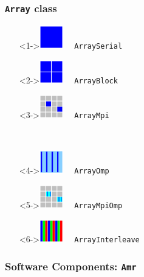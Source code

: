 \documentclass{beamer}
\newcommand{\code}[1]{\texttt{#1}}
\begin{document}
\begin{frame}
\frametitle{\code{Array} class}

\begin{minipage}{1.8in}
\begin{itemize}
\item[]<1->\includegraphics[width=0.4in]{array-serial.png} \ \ \code{ArraySerial}
\item[]<2->\includegraphics[width=0.4in]{array-block.png} \ \ \code{ArrayBlock}
\item[]<3->\includegraphics[width=0.4in]{array-mpi.png} \ \ \code{ArrayMpi}
\end{itemize}
\end{minipage} \ 
\begin{minipage}{2in}
\begin{itemize}
\item[]<4->\includegraphics[width=0.4in]{array-omp.png} \ \ \code{ArrayOmp}
\item[]<5->\includegraphics[width=0.4in]{array-mpi-omp.png} \ \ \code{ArrayMpiOmp}
\item[]<6->\includegraphics[width=0.4in]{array-interleave.png} \ \ \code{ArrayInterleave}
\end{itemize}
\end{minipage}

\end{frame}
    \begin{frame}[fragile] \frametitle{Software Components: \code{Amr}}
\end{frame}
\end{document}
